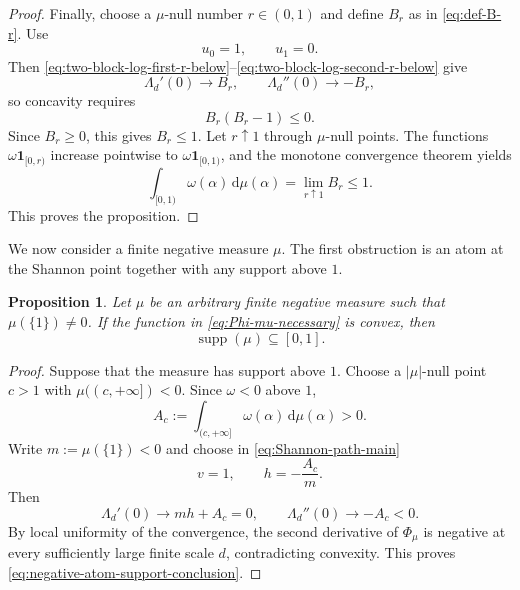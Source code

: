 \documentclass[aps,pra,11pt,onecolumn,nofootinbib,tightenlines]{revtex4-2}
\newtheorem{proposition}[theorem]{Proposition}
\theoremstyle{definition}
\begin{document}
\begin{proof}
Finally, choose a $\mu$-null number $r\in(0,1)$ and define $B_r$ as in \eqref{eq:def-B-r}. Use
\begin{equation}
 u_0=1,
 \qquad
 u_1=0.
 \label{eq:positive-moment-velocities}
\end{equation}
Then \eqref{eq:two-block-log-first-r-below}--\eqref{eq:two-block-log-second-r-below} give
\begin{equation}
 \Lambda_d'(0)\longrightarrow B_r,
 \qquad
 \Lambda_d''(0)\longrightarrow-B_r,
 \label{eq:positive-moment-Lambda-limits}
\end{equation}
so concavity requires
\begin{equation}
 B_r(B_r-1)\leq0.
 \label{eq:B-r-between-zero-one}
\end{equation}
Since $B_r\geq0$, this gives $B_r\leq1$. Let $r\uparrow1$ through $\mu$-null points. The functions $\omega\mathbf1_{[0,r)}$ increase pointwise to $\omega\mathbf1_{[0,1)}$, and the monotone convergence theorem yields
\begin{equation}
 \int_{[0,1)}\omega(\alpha)\,\mathrm d\mu(\alpha)
 =\lim_{r\uparrow1}B_r\leq1.
 \label{eq:positive-moment-limit}
\end{equation}
This proves the proposition.
\end{proof}

We now consider a finite negative measure $\mu$. The first obstruction is an atom at the Shannon point together with any support above $1$.

\begin{proposition}
\label{prop:negative-atom-necessary}
Let $\mu$ be an arbitrary finite negative measure such that $\mu(\{1\})\neq0$. If the function in \eqref{eq:Phi-mu-necessary} is convex, then
\begin{equation}
 \operatorname{supp}(\mu)\subseteq[0,1].
 \label{eq:negative-atom-support-conclusion}
\end{equation}
\end{proposition}

\begin{proof}
Suppose that the measure has support above $1$. Choose a $|\mu|$-null point $c>1$ with $\mu((c,+\infty])<0$. Since $\omega<0$ above $1$,
\begin{equation}
 A_c:=\int_{(c,+\infty]}\omega(\alpha)\,\mathrm d\mu(\alpha)>0.
 \label{eq:negative-atom-A-positive}
\end{equation}
Write $m:=\mu(\{1\})<0$ and choose in \eqref{eq:Shannon-path-main}
\begin{equation}
 v=1,
 \qquad
 h=-\frac{A_c}{m}.
 \label{eq:negative-atom-velocities}
\end{equation}
Then
\begin{equation}
 \Lambda_d'(0)\longrightarrow mh+A_c=0,
 \qquad
 \Lambda_d''(0)\longrightarrow-A_c<0.
 \label{eq:negative-atom-curvature-limit}
\end{equation}
By local uniformity of the convergence, the second derivative of $\Phi_\mu$ is negative at every sufficiently large finite scale $d$, contradicting convexity. This proves \eqref{eq:negative-atom-support-conclusion}.
\end{proof}
\end{document}
